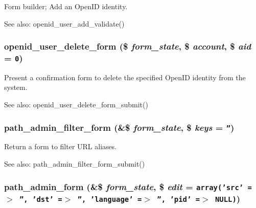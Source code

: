 Form builder; Add an OpenID identity.

\begin{Desc}
\item[See also:]openid\_\-user\_\-add\_\-validate() \end{Desc}
\hypertarget{group__forms_g7c3c27b57a24d9eba5aaf93482f21bb7}{
\subsubsection[{openid\_\-user\_\-delete\_\-form}]{\setlength{\rightskip}{0pt plus 5cm}openid\_\-user\_\-delete\_\-form (\$ {\em form\_\-state}, \/  \$ {\em account}, \/  \$ {\em aid} = {\tt 0})}}
\label{group__forms_g7c3c27b57a24d9eba5aaf93482f21bb7}


Present a confirmation form to delete the specified OpenID identity from the system.

\begin{Desc}
\item[See also:]openid\_\-user\_\-delete\_\-form\_\-submit() \end{Desc}
\hypertarget{group__forms_g7596ad03b96a0cf739d4d33a5fb2fd71}{
\subsubsection[{path\_\-admin\_\-filter\_\-form}]{\setlength{\rightskip}{0pt plus 5cm}path\_\-admin\_\-filter\_\-form (\&\$ {\em form\_\-state}, \/  \$ {\em keys} = {\tt ''})}}
\label{group__forms_g7596ad03b96a0cf739d4d33a5fb2fd71}


Return a form to filter URL aliases.

\begin{Desc}
\item[See also:]path\_\-admin\_\-filter\_\-form\_\-submit() \end{Desc}
\hypertarget{group__forms_gbd04af41e3afa56ef5dd7bffdeea7459}{
\subsubsection[{path\_\-admin\_\-form}]{\setlength{\rightskip}{0pt plus 5cm}path\_\-admin\_\-form (\&\$ {\em form\_\-state}, \/  \$ {\em edit} = {\tt array('src'~=$>$~'',~'dst'~=$>$~'',~'language'~=$>$~'',~'pid'~=$>$~NULL)})}}
\label{group__forms_gbd04af41e3afa56ef5dd7bffdeea7459}


